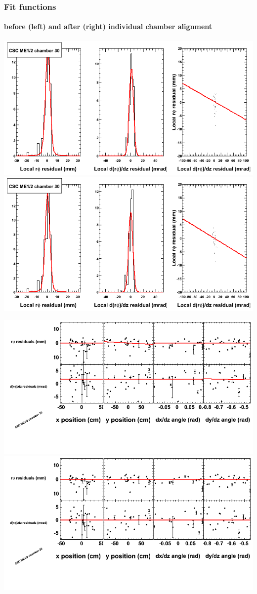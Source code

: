 \documentclass[compress]{beamer}
\begin{document}
\begin{frame}
\frametitle{Fit functions}
\framesubtitle{before (left) and after (right) individual chamber alignment}
\includegraphics[width=0.5\linewidth]{ringfits_3dof/beforefit_MEp12_30_bellcurve.png} \includegraphics[width=0.5\linewidth]{ringfits_3dof/afterfit_MEp12_30_bellcurve.png}

\includegraphics[width=0.5\linewidth]{ringfits_3dof/beforefit_MEp12_30_polynomials.png} \includegraphics[width=0.5\linewidth]{ringfits_3dof/afterfit_MEp12_30_polynomials.png}
\end{frame}
\end{document}

